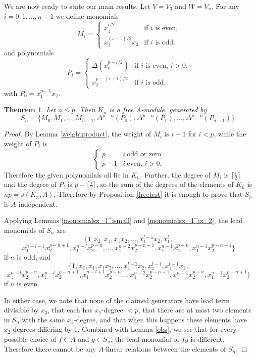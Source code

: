 \documentclass[a4paper]{amsart}
\newtheorem{Theorem}[Lemma]{Theorem}
\newtheorem*{Corollary of Conjecture}{Corollary of Conjecture}
\theoremstyle{definition}
\theoremstyle{remark}
\theoremstyle{Acknowledgments}
\begin{document}
We are now ready to state our main results. Let $V=V_3$ and $W=V_n$. For any $i = 0,1, \ldots, n-1$ we define monomials
\[M_i =  \left\{ \begin{array}{lr} x_1^{i/2} & \text{if $i$ is even,}\\ x_1^{(i-1)/2}x_2 & \text{if $i$ is odd}.\end{array} \right.\]
and polynomials 
\[P_i =  \left\{ \begin{array}{lr} \Delta(x_1^{p-i/2}) & \text{if $i$ is even, $i>0$,}\\ x_1^{p-(i+1)/2} & \text{if $i$ is odd}.\end{array} \right.\] with $P_0 = x_1^{p-1}x_2$.

\begin{Theorem}
\label{kngens}
Let $n \leq p$. Then $K_n$ is a free $A$-module, generated by 
\[S_n = \{M_0,M_1, \ldots, M_{n-1}, \Delta^{p-n}(P_0), \Delta^{p-n}(P_1), \ldots, \Delta^{p-n}(P_{n-1})\}.\]
\end{Theorem}

\begin{proof}
By Lemma \ref{weightproduct}, the weight of $M_i$ is $i+1$ for $i<p$, while the weight of $P_i$ is
\[\left\{\begin{array}{lr} p & i\ \text{odd or zero} \\ p-1 & i\ \text{even, $i>0$.} \end{array} \right.\] Therefore the given polynomials all lie in $K_n$. Further, the degree of $M_i$ is $\lceil \frac{i}{2} \rceil$ and the degree of $P_i$ is $p-\lceil \frac{i}{2} \rceil$, so the sum of the degrees of the elements of $K_n$ is $np = s(K_n,A)$. Therefore by Proposition \ref{freetest} it is enough to prove that $S_n$ is $A$-independent.

Applying Lemmas \ref{monomialsx_1^ismall} and \ref{monomialsx_1^ix_2}, the lead monomials of $S_n$ are
\[\{1,x_2, x_1, x_1x_2, \ldots, x_1^{l-1}x_2, x_1^l,\]\[ x_1^{n-l-1}x_2^{p-n+1}, x_1^{n-l}x_2^{p-n}, \ldots, x_1^{n-2}x_2^{p-n+1}, x_1^{n-1}x_2^{p-n}, x_1^{n-1}x_2^{p-n+1}\}\] if $n$ is odd, and 
\[\{1,x_2, x_1, x_1x_2, \ldots, x_1^{l-2}x_2, x_1^{l-1}, x_1^{l-1}x_2,\]\[ x_1^{n-l}x_2^{p-n}, x_1^{n-l}x_2^{p-n+1}, x_1^{n-l+1}x_2^{p-n} \ldots, x_1^{n-2}x_2^{p-n+1}, x_1^{n-1}x_2^{p-n}, x_1^{n-1}x_2^{p-n+1}\}\] if $n$ is even.

In either case, we note that none of the claimed generators have lead term divisible by $x_3$, that each has $x_1$-degree $<p$, that there are at most two elements in $S_n$ with the same $x_1$-degree, and that when this happens these elements have $x_2$-degrees differing by 1. Combined with Lemma \ref{obs}, we see that for every possible choice of $f \in A$ and $g \in S_n$, the lead monomial of $fg$ is different. Therefore there cannot be any $A$-linear relations between the elements of $S_n$.   
\end{proof}
\end{document}
